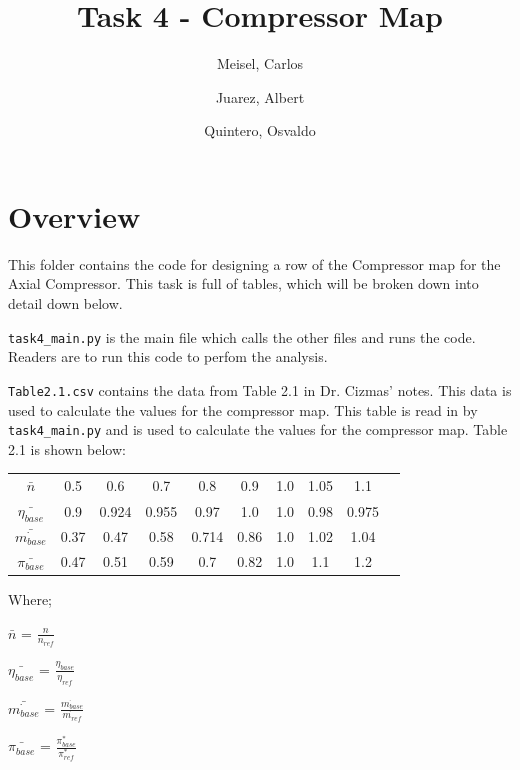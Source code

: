 \documentclass[12pt,english]{article}
\author{
    Meisel, Carlos \\
  \and
  Juarez, Albert\\
  \and
    Quintero, Osvaldo\\
}
\title{Task 4 - Compressor Map}
\begin{document}
  \maketitle

\section*{Overview}
This folder contains the code for designing a row of the Compressor map for the Axial Compressor. This task is full of tables, which will be broken down into detail down below.

\vspace*{3pt}

\verb|task4_main.py| is the main file which calls the other files and runs the code. Readers are to run this code to perfom the analysis.

\vspace*{3pt}

\verb|Table2.1.csv| contains the data from Table 2.1 in Dr. Cizmas' notes. This data is used to calculate the values for the compressor map. This table is read in by \verb|task4_main.py| and is used to calculate the values for the compressor map. Table 2.1 is shown below:


\begin{center}
    \begin{tabular}{ c c c c c c c c c c }
     $\bar{n}$ & 0.5 & 0.6 & 0.7 & 0.8 & 0.9 & 1.0 & 1.05 & 1.1 \\ 
        $\bar{\eta_{base}}$ & 0.9 & 0.924 & 0.955 & 0.97 & 1.0 & 1.0 & 0.98 & 0.975 \\
        $\bar{\dot{m_{base}}}$ & 0.37 & 0.47 & 0.58 & 0.714 & 0.86 & 1.0 & 1.02 & 1.04 \\
        $\bar{\pi_{base}}$ & 0.47 & 0.51 & 0.59 & 0.7 & 0.82 & 1.0 & 1.1 & 1.2 \\
    \end{tabular}
    \end{center}

\vspace*{3pt}

Where; 
\begin{center}
    $\bar{n}$ = $\frac{n}{n_{ref}}$ 

    \vspace*{3pt}

    $\bar{\eta_{base}}$ = $\frac{\eta_{base}}{\eta_{ref}}$
    
    \vspace*{3pt}
    
    $\bar{\dot{m_{base}}}$ = $\frac{\dot{m_{base}}}{\dot{m_{ref}}}$
    
    \vspace*{3pt}
    
    $\bar{\pi_{base}}$ = $\frac{\pi^* _{base}}{\pi^* _{ref}}$
\end{center}
\end{document}
